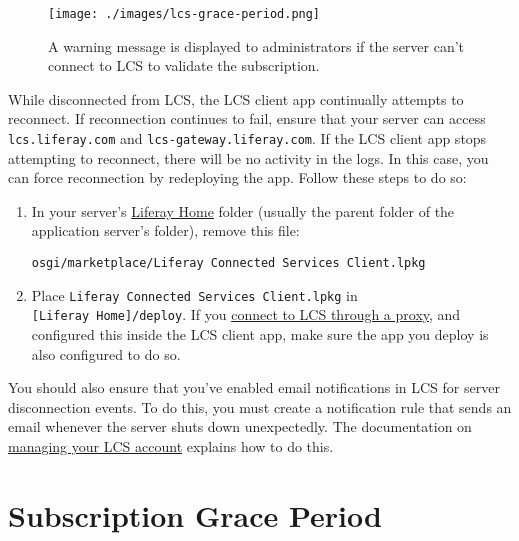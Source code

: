 \begin{figure}
\centering
\texttt{[image: ./images/lcs-grace-period.png]}
\caption{A warning message is displayed to administrators if the server
can't connect to LCS to validate the subscription.}
\end{figure}

While disconnected from LCS, the LCS client app continually attempts to
reconnect. If reconnection continues to fail, ensure that your server
can access \texttt{lcs.liferay.com} and
\texttt{lcs-gateway.liferay.com}. If the LCS client app stops attempting
to reconnect, there will be no activity in the logs. In this case, you
can force reconnection by redeploying the app. Follow these steps to do
so:

\begin{enumerate}
\def\labelenumi{\arabic{enumi}.}
\item
  In your server's
  \href{/docs/7-2/deploy/-/knowledge_base/d/liferay-home}{Liferay Home}
  folder (usually the parent folder of the application server's folder),
  remove this file:

\begin{verbatim}
osgi/marketplace/Liferay Connected Services Client.lpkg
\end{verbatim}
\item
  Place \texttt{Liferay\ Connected\ Services\ Client.lpkg} in
  \texttt{{[}Liferay\ Home{]}/deploy}. If you
  \href{/docs/7-2/deploy/-/knowledge_base/d/lcs-preconfiguration\#preconfiguring-lcs-to-connect-through-a-proxy}{connect
  to LCS through a proxy}, and configured this inside the LCS client
  app, make sure the app you deploy is also configured to do so.
\end{enumerate}

You should also ensure that you've enabled email notifications in LCS
for server disconnection events. To do this, you must create a
notification rule that sends an email whenever the server shuts down
unexpectedly. The documentation on
\href{/docs/7-2/deploy/-/knowledge_base/d/managing-your-lcs-account}{managing
your LCS account} explains how to do this.

\section{Subscription Grace Period}\label{subscription-grace-period}

